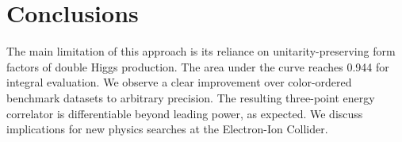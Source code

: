 \section{Conclusions}\label{sec:conclusions}

The main limitation of this approach is its reliance on
unitarity-preserving form factors of double Higgs production. The area
under the curve reaches 0.944 for integral evaluation. We observe a
clear improvement over color-ordered benchmark datasets to arbitrary
precision. The resulting three-point energy correlator is differentiable
beyond leading power, as expected. We discuss implications for new
physics searches at the Electron-Ion Collider.

